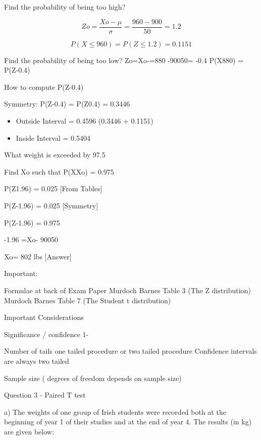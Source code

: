 \documentclass[12pt]{report}
\begin{document}
{Find the probability of being too high?

\[Zo=\frac{Xo-\mu}{\sigma}= \frac{960 -900}{50}= 1.2\]

\[P(X \leq 960) = P(Z \leq 1.2) = 0.1151\]


Find the probability of being too low?
Zo=Xo-=880 -90050= -0.4 
P(X880) = P(Z-0.4)  

How to compute P(Z-0.4)

Symmetry: 	P(Z-0.4) = P(Z0.4) = 0.3446


\begin{itemize}
\item Outside Interval = 0.4596        (0.3446 +  0.1151)
\item Inside Interval = 0.5404
\end{itemize}



What weight is exceeded by 97.5%

Find Xo  such that P(XXo) = 0.975


P(Z1.96) = 0.025     [From Tables] 

P(Z-1.96) = 0.025  [Symmetry]

P(Z-1.96) = 0.975         

-1.96 =Xo- 90050


Xo= 802 lbs  [Answer]


Important:

Formulae at back of Exam Paper
Murdoch Barnes Table 3 (The Z distribution)
Murdoch Barnes Table 7 (The Student t distribution)

Important Considerations

Significance     /    confidence 1-

Number of tails   
one tailed procedure or two tailed procedure
Confidence intervals are always two tailed

Sample size   ( degrees of freedom depends on sample size)



Question 3 - Paired T test

a) The weights of one group of Irish students were recorded both at the beginning of year 1 of their studies and at the end of year 4.
The results (in kg) are given below:

}
\end{document}
